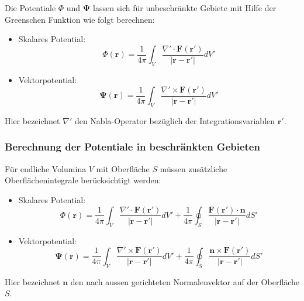 Die Potentiale $\Phi$ und $\boldsymbol{\Psi}$ lassen sich für unbeschränkte Gebiete mit Hilfe der Greenschen Funktion wie folgt berechnen:

\begin{itemize}
\item Skalares Potential:
\begin{equation}
\Phi(\boldsymbol{r}) = \frac{1}{4 \pi} \int_{V} \frac{\nabla' \cdot \boldsymbol{F}(\boldsymbol{r'})}{|\boldsymbol{r} - \boldsymbol{r'}|} dV'
\end{equation}

\item Vektorpotential:
\begin{equation}
\boldsymbol{\Psi}(\boldsymbol{r}) = \frac{1}{4 \pi} \int_{V} \frac{\nabla' \times \boldsymbol{F}(\boldsymbol{r'})}{|\boldsymbol{r} - \boldsymbol{r'}|} dV'
\end{equation}
\end{itemize}
Hier bezeichnet $\nabla'$ den Nabla-Operator bezüglich der Integrationsvariablen $\boldsymbol{r'}$.

\subsubsection{Berechnung der Potentiale in beschränkten Gebieten}

Für endliche Volumina $V$ mit Oberfläche $S$ müssen zusätzliche Oberflächenintegrale berücksichtigt werden:

\begin{itemize}
\item Skalares Potential:
\begin{equation}
\Phi (\boldsymbol{r}) = \frac{1}{4\pi} \int_V \frac{\nabla' \cdot \boldsymbol{F}(\boldsymbol{r}')}{|\boldsymbol{r} - \boldsymbol{r}'|} dV' + \frac{1}{4\pi} \oint_S \frac{\boldsymbol{F}(\boldsymbol{r}') \cdot \boldsymbol{n}}{|\boldsymbol{r} - \boldsymbol{r}'|} dS'
\end{equation}

\item Vektorpotential:
\begin{equation}
\boldsymbol{\Psi}(\boldsymbol{r}) = \frac{1}{4\pi} \int_V \frac{\nabla' \times \boldsymbol{F}(\boldsymbol{r}')}{|\boldsymbol{r} - \boldsymbol{r}'|} dV' + \frac{1}{4\pi} \oint_S \frac{\boldsymbol{n} \times \boldsymbol{F}(\boldsymbol{r}')}{|\boldsymbol{r} - \boldsymbol{r}'|} dS'
\end{equation}
\end{itemize}
Hier bezeichnet $\boldsymbol{n}$ den nach aussen gerichteten Normalenvektor auf der Oberfläche $S$.

